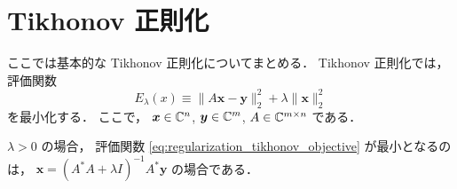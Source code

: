 %

\chapter{Tikhonov 正則化}

ここでは基本的な Tikhonov 正則化についてまとめる．
Tikhonov 正則化では，評価関数
\begin{equation}
    E_{\lambda}(x) \equiv \|A \bm{x} - \bm{y}\|_2^2 + \lambda \|\bm{x}\|_2^2
    \label{eq:regularization_tikhonov_objective}
\end{equation}
を最小化する．
ここで，
$\bm{x} \in \mathbb{C}^n$,
$\bm{y} \in \mathbb{C}^m$,
$A \in \mathbb{C}^{m \times n}$
である．

\begin{theorem}\label{theorem:regularization_tikhonov_solution}
    $\lambda > 0$ の場合，
    評価関数 \eqref{eq:regularization_tikhonov_objective} が最小となるのは，
    $\bm{x} = (A^* A + \lambda I)^{-1} A^* \bm{y}$ の場合である．
\end{theorem}
